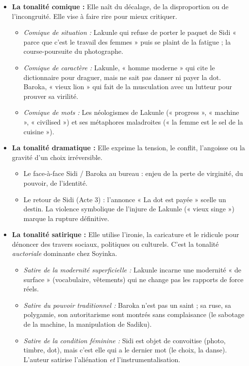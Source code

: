 \documentclass[11pt]{article}
\begin{document}
\begin{definition}
\begin{itemize}
    \item \textbf{La tonalité comique :} Elle naît du décalage, de la disproportion ou de l'incongruité. Elle vise à faire rire pour mieux critiquer.
        \begin{itemize}
            \item \emph{Comique de situation :} Lakunle qui refuse de porter le paquet de Sidi « parce que c'est le travail des femmes » puis se plaint de la fatigue ; la course-poursuite du photographe.
            \item \emph{Comique de caractère :} Lakunle, « homme moderne » qui cite le dictionnaire pour draguer, mais ne sait pas danser ni payer la dot. Baroka, « vieux lion » qui fait de la musculation avec un lutteur pour prouver sa virilité.
            \item \emph{Comique de mots :} Les néologismes de Lakunle (« progress », « machine », « civilised ») et ses métaphores maladroites (« la femme est le sel de la cuisine »).
        \end{itemize}
    \item \textbf{La tonalité dramatique :} Elle exprime la tension, le conflit, l'angoisse ou la gravité d'un choix irréversible.
        \begin{itemize}
            \item Le face-à-face Sidi / Baroka au bureau : enjeu de la perte de virginité, du pouvoir, de l'identité.
            \item Le retour de Sidi (Acte 3) : l'annonce « La dot est payée » scelle un destin. La violence symbolique de l'injure de Lakunle (« vieux singe ») marque la rupture définitive.
        \end{itemize}
    \item \textbf{La tonalité satirique :} Elle utilise l'ironie, la caricature et le ridicule pour dénoncer des travers sociaux, politiques ou culturels. C'est la tonalité \emph{auctoriale} dominante chez Soyinka.
        \begin{itemize}
            \item \emph{Satire de la modernité superficielle :} Lakunle incarne une modernité « de surface » (vocabulaire, vêtements) qui ne change pas les rapports de force réels.
            \item \emph{Satire du pouvoir traditionnel :} Baroka n'est pas un saint ; sa ruse, sa polygamie, son autoritarisme sont montrés sans complaisance (le sabotage de la machine, la manipulation de Sadiku).
            \item \emph{Satire de la condition féminine :} Sidi est objet de convoitise (photo, timbre, dot), mais c'est elle qui a le dernier mot (le choix, la danse). L'auteur satirise l'aliénation \emph{et} l'instrumentalisation.
        \end{itemize}
\end{itemize}
\end{definition}
\end{document}
